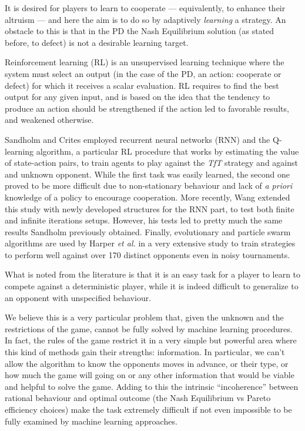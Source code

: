 \documentclass[journal,a4paper,10pt,twoside]{IEEEtran} %
\begin{document}
It is desired for players to learn to cooperate --- equivalently, to enhance their altruism --- and here the aim is to do so by adaptively \textit{learning} a strategy. An obstacle to this is that in the PD the Nash Equilibrium solution (as stated before, to defect) is not a desirable learning target. \cite{coopSeqRL}

Reinforcement learning (RL) is an unsupervised learning technique where the system must select an output (in the case of the PD, an action: cooperate or defect) for which it receives a scalar evaluation. RL requires to find the best output for any given input, and is based on the idea that the tendency to produce an action should be strengthened if the action led to favorable results, and weakened otherwise. \cite{sandholmRL}

Sandholm and Crites \cite{sandholmRL} employed recurrent neural networks (RNN) and the Q-learning algorithm, a particular RL procedure that works by estimating the value of state-action pairs, to train agents to play against the \textit{TfT} strategy and against and unknown opponent. While the first task was easily learned, the second one proved to be more difficult due to non-stationary behaviour and lack of \textit{a priori} knowledge of a policy to encourage cooperation.
More recently, Wang \cite{kedaoRL} extended this study with newly developed structures for the RNN part, to test both finite and infinite iterations setups. However, his tests led to pretty much the same results Sandholm previously obtained.
Finally, evolutionary and particle swarm algorithms are used by Harper \textit{et al.} in a very extensive study \cite{plosRLdominant} to train strategies to perform well against over 170 distinct opponents even in noisy tournaments.

What is noted from the literature is that it is an easy task for a player to learn to compete against a deterministic player, while it is indeed difficult to generalize to an opponent with unspecified behaviour.

We believe this is a very particular problem that, given the unknown and the restrictions of the game, cannot be fully solved by machine learning procedures. In fact, the rules of the game restrict it in a very simple but powerful area where this kind of methods gain their strengths: information. In particular, we can't allow the algorithm to know the opponents moves in advance, or their type, or how much the game will going on or any other information that would be viable and helpful to solve the game. Adding to this the intrinsic ``incoherence'' between rational behaviour and optimal outcome (the Nash Equilibrium vs Pareto efficiency choices) make the task extremely difficult if not even impossible to be fully examined by machine learning approaches.
\end{document}

